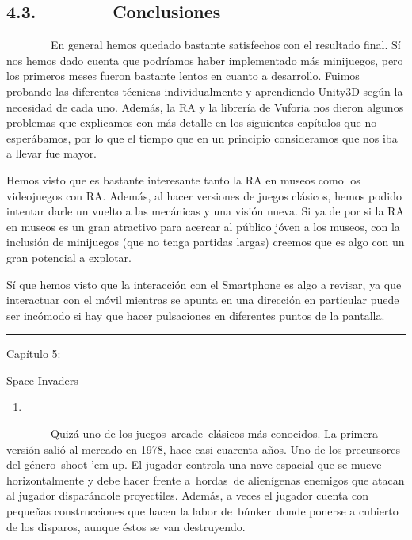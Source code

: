 \subsection{4.3.~~~~~~~~Conclusiones}\label{conclusiones}

~~~~~~~~En general hemos quedado bastante satisfechos con el resultado
final. Sí nos hemos dado cuenta que podríamos haber implementado más
minijuegos, pero los primeros meses fueron bastante lentos en cuanto a
desarrollo. Fuimos probando las diferentes técnicas individualmente y
aprendiendo Unity3D según la necesidad de cada uno. Además, la RA y la
librería de Vuforia nos dieron algunos problemas que explicamos con más
detalle en los siguientes capítulos que no esperábamos, por lo que el
tiempo que en un principio consideramos que nos iba a llevar fue mayor.

Hemos visto que es bastante interesante tanto la RA en museos como los
videojuegos con RA. Además, al hacer versiones de juegos clásicos, hemos
podido intentar darle un vuelto a las mecánicas y una visión nueva. Si
ya de por si la RA en museos es un gran atractivo para acercar al
público jóven a los museos, con la inclusión de minijuegos (que no tenga
partidas largas) creemos que es algo con un gran potencial a explotar.

Sí que hemos visto que la interacción con el Smartphone es algo a
revisar, ya que interactuar con el móvil mientras se apunta en una
dirección en particular puede ser incómodo si hay que hacer pulsaciones
en diferentes puntos de la pantalla.

\begin{center}\rule{3in}{0.4pt}\end{center}

Capítulo 5:

Space Invaders

\begin{enumerate}
\def\labelenumi{\arabic{enumi}.}
\item
\end{enumerate}

~~~~~~~~Quizá uno de los juegos~arcade~clásicos más conocidos. La
primera versión salió al mercado en 1978, hace casi cuarenta años. Uno
de los precursores del género~shoot 'em up. El jugador controla una nave
espacial que se mueve horizontalmente y debe hacer frente a~hordas~de
alienígenas enemigos que atacan al jugador disparándole proyectiles.
Además, a veces el jugador cuenta con pequeñas construcciones que hacen
la labor de~búnker~donde ponerse a cubierto de los disparos, aunque
éstos se van destruyendo.

